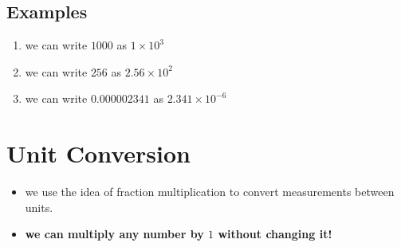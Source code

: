 \documentclass[11pt, oneside]{article}   	%
\begin{document}
\subsection{Examples}
\begin{enumerate}[label=Example \arabic*]
\item we can write $1000$ as $1 \times 10^{3}$
\item we can write $256$ as $2.56 \times 10^{2}$
\item we can write $0.000002341$ as $ 2.341 \times 10^{-6} $
\end{enumerate}



\section{Unit Conversion}
\begin{itemize}
\item we use the idea of fraction multiplication to convert measurements between units. 
\item \textbf{we can multiply any number by $1$ without changing it!}
\end{itemize}
\end{document}
